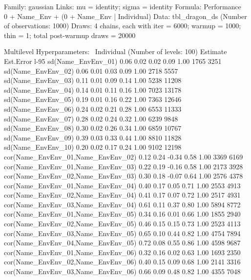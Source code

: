 \documentclass[a4paper,12pt,twoside]{article}
\begin{document}
\begin{Routput}
 Family: gaussian 
  Links: mu = identity; sigma = identity 
Formula: Performance ~ 0 + Name_Env + (0 + Name_Env | Individual) 
   Data: tbl_dragon_ds (Number of observations: 1000) 
  Draws: 4 chains, each with iter = 6000; warmup = 1000; thin = 1;
         total post-warmup draws = 20000

Multilevel Hyperparameters:
~Individual (Number of levels: 100) 
                                Estimate Est.Error l-95%
sd(Name_EnvEnv_01)                  0.06      0.02     0.02     0.09 1.00     1765     3251
sd(Name_EnvEnv_02)                  0.06      0.01     0.03     0.09 1.00     2718     5557
sd(Name_EnvEnv_03)                  0.11      0.01     0.09     0.14 1.00     5238    11208
sd(Name_EnvEnv_04)                  0.14      0.01     0.11     0.16 1.00     7023    13178
sd(Name_EnvEnv_05)                  0.19      0.01     0.16     0.22 1.00     7363    12646
sd(Name_EnvEnv_06)                  0.24      0.02     0.21     0.28 1.00     6553    11333
sd(Name_EnvEnv_07)                  0.28      0.02     0.24     0.32 1.00     6239     9848
sd(Name_EnvEnv_08)                  0.30      0.02     0.26     0.34 1.00     6859    10767
sd(Name_EnvEnv_09)                  0.39      0.03     0.33     0.44 1.00     8810    11828
sd(Name_EnvEnv_10)                  0.20      0.02     0.17     0.24 1.00     9102    12198
cor(Name_EnvEnv_01,Name_EnvEnv_02)  0.12      0.24    -0.34     0.58 1.00     3369     6169
cor(Name_EnvEnv_01,Name_EnvEnv_03)  0.22      0.19    -0.16     0.58 1.00     2173     3928
cor(Name_EnvEnv_02,Name_EnvEnv_03)  0.30      0.18    -0.07     0.64 1.00     2576     4378
cor(Name_EnvEnv_01,Name_EnvEnv_04)  0.40      0.17     0.05     0.71 1.00     2553     4913
cor(Name_EnvEnv_02,Name_EnvEnv_04)  0.41      0.17     0.07     0.72 1.00     2517     4931
cor(Name_EnvEnv_03,Name_EnvEnv_04)  0.61      0.11     0.37     0.80 1.00     5894     8772
cor(Name_EnvEnv_01,Name_EnvEnv_05)  0.34      0.16     0.01     0.66 1.00     1855     2940
cor(Name_EnvEnv_02,Name_EnvEnv_05)  0.46      0.15     0.15     0.73 1.00     2523     4113
cor(Name_EnvEnv_03,Name_EnvEnv_05)  0.65      0.10     0.44     0.82 1.00     4754     7894
cor(Name_EnvEnv_04,Name_EnvEnv_05)  0.72      0.08     0.55     0.86 1.00     4598     9687
cor(Name_EnvEnv_01,Name_EnvEnv_06)  0.32      0.16     0.02     0.63 1.00     1693     2350
cor(Name_EnvEnv_02,Name_EnvEnv_06)  0.40      0.15     0.09     0.68 1.00     2141     3316
cor(Name_EnvEnv_03,Name_EnvEnv_06)  0.66      0.09     0.48     0.82 1.00     4355     7048

\end{Routput}
\end{document}
